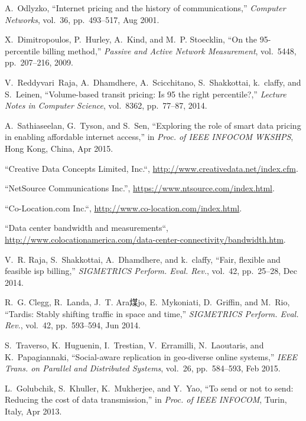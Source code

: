 \documentclass[10pt,journal,compsoc]{IEEEtran}
\begin{document}
\begin{thebibliography}{10}

A.~Odlyzko, ``Internet pricing and the history of communications,'' {\em
  Computer Networks}, vol.~36, pp.~493--517, Aug 2001.

X.~Dimitropoulos, P.~Hurley, A.~Kind, and M.~P. Stoecklin, ``On the
  95-percentile billing method,'' {\em Passive and Active Network Measurement},
  vol.~5448, pp.~207--216, 2009.

V.~Reddyvari~Raja, A.~Dhamdhere, A.~Scicchitano, S.~Shakkottai, k.~claffy, and
  S.~Leinen, ``Volume-based transit pricing: Is 95 the right percentile?,''
  {\em Lecture Notes in Computer Science}, vol.~8362, pp.~77--87, 2014.

A.~Sathiaseelan, G.~Tyson, and S.~Sen, ``Exploring the role of smart data
  pricing in enabling affordable internet access,'' in {\em Proc. of IEEE
  INFOCOM WKSHPS}, Hong Kong, China, Apr 2015.

``Creative Data Concepts Limited, Inc.``, \url{http://www.creativedata.net/index.cfm}.

``NetSource Communications Inc.'', \url{https://www.ntsource.com/index.html}.

``Co-Location.com Inc.``, \url{http://www.co-location.com/index.html}.

``Data center bandwidth and measurements``, \url{http://www.colocationamerica.com/data-center-connectivity/bandwidth.htm}.

V.~R. Raja, S.~Shakkottai, A.~Dhamdhere, and k.~claffy, ``Fair, flexible and
  feasible isp billing,'' {\em SIGMETRICS Perform. Eval. Rev.}, vol.~42,
  pp.~25--28, Dec 2014.

R.~G. Clegg, R.~Landa, J.~T. Ara煤jo, E.~Mykoniati, D.~Griffin, and M.~Rio,
  ``Tardis: Stably shifting traffic in space and time,'' {\em SIGMETRICS
  Perform. Eval. Rev.}, vol.~42, pp.~593--594, Jun 2014.

S.~Traverso, K.~Huguenin, I.~Trestian, V.~Erramilli, N.~Laoutaris, and
  K.~Papagiannaki, ``Social-aware replication in geo-diverse online systems,''
  {\em IEEE Trans. on Parallel and Distributed Systems}, vol.~26,
  pp.~584--593, Feb 2015.

L.~Golubchik, S.~Khuller, K.~Mukherjee, and Y.~Yao, ``To send or not to send:
  Reducing the cost of data transmission,'' in {\em Proc. of IEEE INFOCOM},
 Turin, Italy, Apr 2013.


\end{thebibliography}
\end{document}
